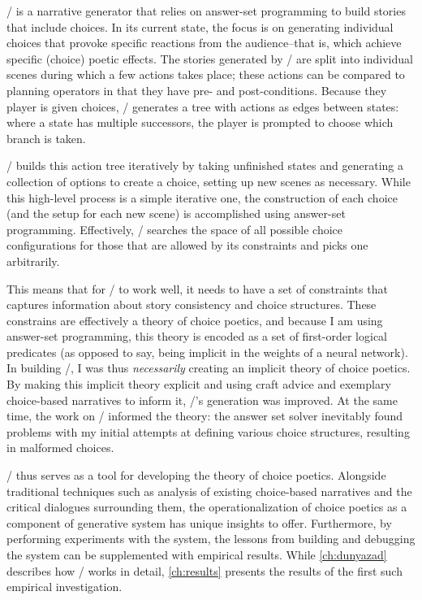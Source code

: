 \dunyazad/ is a narrative generator that relies on answer-set programming to build stories that include choices.
%
In its current state, the focus is on generating individual choices that provoke specific reactions from the audience--that is, which achieve specific (choice) poetic effects.
%
The stories generated by \dunyazad/ are split into individual scenes during which a few actions takes place; these actions can be compared to planning operators in that they have pre- and post-conditions.
%
Because they player is given choices, \dunyazad/ generates a tree with actions as edges between states: where a state has multiple successors, the player is prompted to choose which branch is taken.


\dunyazad/ builds this action tree iteratively by taking unfinished states and generating a collection of options to create a choice, setting up new scenes as necessary.
%
While this high-level process is a simple iterative one, the construction of each choice (and the setup for each new scene) is accomplished using answer-set programming.
%
Effectively, \dunyazad/ searches the space of all possible choice configurations for those that are allowed by its constraints and picks one arbitrarily.


This means that for \dunyazad/ to work well, it needs to have a set of constraints that captures information about story consistency and choice structures.
%
These constrains are effectively a theory of choice poetics, and because I am using answer-set programming, this theory is encoded as a set of first-order logical predicates (as opposed to say, being implicit in the weights of a neural network).
%
In building \dunyazad/, I was thus \emph{necessarily} creating an implicit theory of choice poetics.
%
By making this implicit theory explicit and using craft advice and exemplary choice-based narratives to inform it, \dunyazad/'s generation was improved.
%
At the same time, the work on \dunyazad/ informed the theory: the answer set solver inevitably found problems with my initial attempts at defining various choice structures, resulting in malformed choices.


\dunyazad/ thus serves as a tool for developing the theory of choice poetics.
%
Alongside traditional techniques such as analysis of existing choice-based narratives and the critical dialogues surrounding them, the operationalization of choice poetics as a component of generative system has unique insights to offer.
%
Furthermore, by performing experiments with the system, the lessons from building and debugging the system can be supplemented with empirical results.
%
While \cref{ch:dunyazad} describes how \dunyazad/ works in detail, \cref{ch:results} presents the results of the first such empirical investigation.



